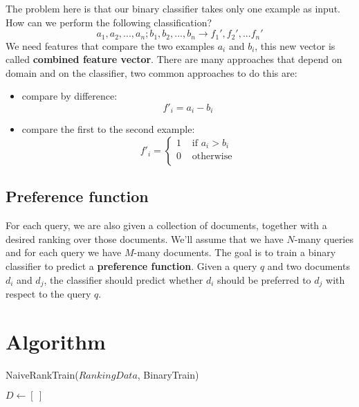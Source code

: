 The problem here is that our binary classifier takes only one example as input. How can we perform the following classification?
\begin{equation}
    a_1, a_2, ..., a_n; b_1, b_2, ..., b_n \to f_1', f_2', ... f_n'
\end{equation}
We need features that compare the two examples \(a_i\) and \(b_i\), this new vector is called \textbf{combined feature vector}. There are many approaches that depend on domain and on the classifier, two common approaches to do this are:
\begin{itemize}
    \item compare by difference:
    \begin{equation*}
        f'_i = a_i - b_i
    \end{equation*}
    \item compare the first to the second example:
    \begin{equation*}
        f'_i = \begin{cases}
            1 &\text{ if } a_i > b_i\\
            0 &\text{ otherwise}\\
        \end{cases}
    \end{equation*}
\end{itemize}

\subsection{Preference function}
For each query, we are also given a collection of documents, together with a desired ranking over those documents. We'll assume that we have \(N\)-many queries and for each query we have \(M\)-many documents. The goal is to train a binary classifier to predict a \textbf{preference function}. Given a query \(q\) and two documents \(d_i\) and \(d_j\), the classifier should predict whether \(d_i\) should be preferred to \(d_j\) with respect to the query \(q\).

\section{Algorithm}
\begin{algorithm}
    \caption{NaiveRankTrain($RankingData$, BinaryTrain)}
    \label{alg:naive_rank_train}
$D \gets [\ ]$\;
\end{algorithm}

